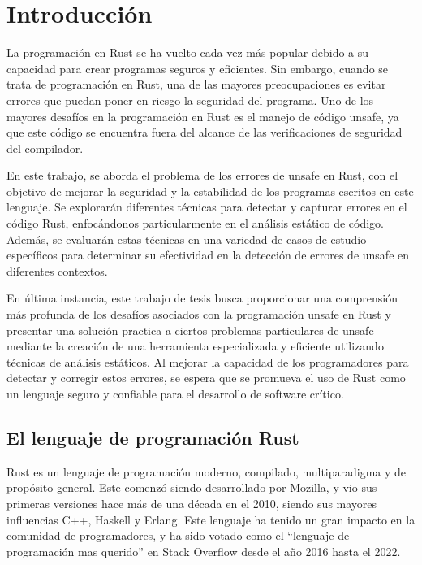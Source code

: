 \chapter{Introducción}

La programación en Rust se ha vuelto cada vez más popular debido a su capacidad para crear programas seguros y eficientes. Sin embargo, cuando se trata de programación en Rust, una de las mayores preocupaciones es evitar errores que puedan poner en riesgo la seguridad del programa. Uno de los mayores desafíos en la programación en Rust es el manejo de código unsafe, ya que este código se encuentra fuera del alcance de las verificaciones de seguridad del compilador.

En este trabajo, se aborda el problema de los errores de unsafe en Rust, con el objetivo de mejorar la seguridad y la estabilidad de los programas escritos en este lenguaje. Se explorarán diferentes técnicas para detectar y capturar errores en el código Rust, enfocándonos particularmente en el análisis estático de código. Además, se evaluarán estas técnicas en una variedad de casos de estudio específicos para determinar su efectividad en la detección de errores de unsafe en diferentes contextos.

En última instancia, este trabajo de tesis busca proporcionar una comprensión más profunda de los desafíos asociados con la programación unsafe en Rust y presentar una solución practica a ciertos problemas particulares de unsafe mediante la creación de una herramienta especializada y eficiente utilizando técnicas de análisis estáticos. Al mejorar la capacidad de los programadores para detectar y corregir estos errores, se espera que se promueva el uso de Rust como un lenguaje seguro y confiable para el desarrollo de software crítico.

\section{El lenguaje de programación Rust}

Rust es un lenguaje de programación moderno, compilado, multiparadigma y de propósito general. Este comenzó siendo desarrollado por Mozilla, y vio sus primeras versiones hace más de una década en el 2010, siendo sus mayores influencias C++, Haskell y Erlang. Este lenguaje ha tenido un gran impacto en la comunidad de programadores, y ha sido votado como el “lenguaje de programación mas querido” en Stack Overflow desde el año 2016 hasta el 2022.


